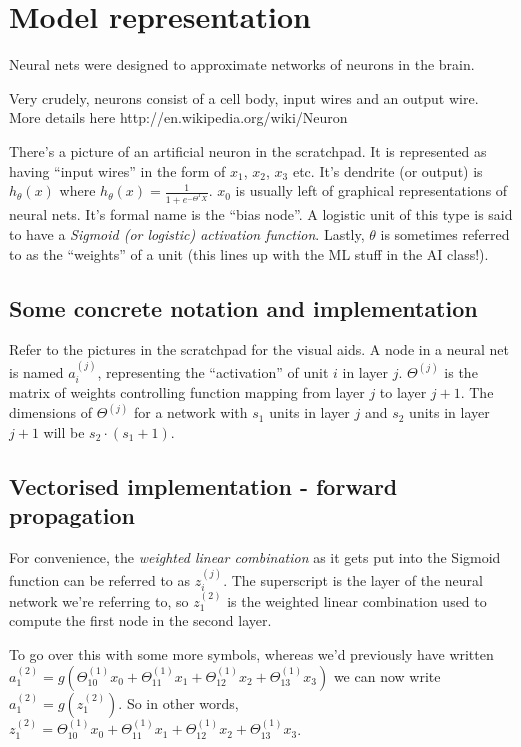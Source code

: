 \section{Model representation}

Neural nets were designed to approximate networks of neurons in the brain.

Very crudely, neurons consist of a cell body, input wires and an output wire. More details here http://en.wikipedia.org/wiki/Neuron

There's a picture of an artificial neuron in the scratchpad. It is represented as having ``input wires'' in the form of $x_1$, $x_2$, $x_3$ etc. It's dendrite (or output) is $h_\theta(x)$ where $h_\theta(x) = \frac{1}{1 + e^{-\Theta^TX}}$. $x_0$ is usually left of graphical representations of neural nets. It's formal name is the ``bias node''. A logistic unit of this type is said to have a \emph{Sigmoid (or logistic) activation function}. Lastly, $\theta$ is sometimes referred to as the ``weights'' of a unit (this lines up with the ML stuff in the AI class!).

\subsection{Some concrete notation and implementation}

Refer to the pictures in the scratchpad for the visual aids. A node in a neural net is named $a_i^{(j)}$, representing the ``activation'' of unit $i$ in layer $j$. $\Theta^{(j)}$ is the matrix of weights controlling function mapping from layer $j$ to layer $j + 1$. The dimensions of $\Theta^{(j)}$ for a network with $s_1$ units in layer $j$ and $s_2$ units in layer $j + 1$ will be $s_2 \cdot (s_1 + 1)$.

\subsection{Vectorised implementation - forward propagation}

For convenience, the \emph{weighted linear combination} as it gets put into the Sigmoid function can be referred to as $z_i^{(j)}$. The superscript is the layer of the neural network we're referring to, so $z_1^{(2)}$ is the weighted linear combination used to compute the first node in the second layer.

To go over this with some more symbols, whereas we'd previously have written $a_1^{(2)} = g(\Theta_{10}^{(1)}x_0 + \Theta_{11}^{(1)}x_1 + \Theta_{12}^{(1)}x_2 + \Theta_{13}^{(1)}x_3)$ we can now write $a_1^{(2)} = g(z_1^{(2)})$. So in other words, $z_1^{(2)} = \Theta_{10}^{(1)}x_0 + \Theta_{11}^{(1)}x_1 + \Theta_{12}^{(1)}x_2 + \Theta_{13}^{(1)}x_3$.

